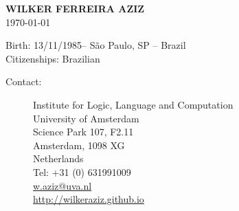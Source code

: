 \documentclass[10pt,a4paper,oneside]{article}
\makeatletter
\newcommand{\myname}{WILKER FERREIRA AZIZ\xspace}
\newcommand{\birthday}{13/11/1985\xspace}
\newcommand{\location}{S\~ao Paulo, SP -- Brazil\xspace}
\newcommand{\citizenships}{Brazilian\xspace}
\newcommand{\contact}{Institute for Logic, Language and Computation \\
University of Amsterdam \\
Science Park 107, F2.11 \\
Amsterdam, 1098 XG \\
Netherlands  \\
Tel: +31 (0) 631991009 \\
\url{w.aziz@uva.nl} \\
\url{http://wilkeraziz.github.io} 
}
\makeatother
\begin{document}




\begin{center}
{\large \bf
\myname \\
}
{\small
\today \\
}
\end{center}

Birth: \birthday -- \location \\
Citizenships: \citizenships \\
\vspace{2mm}
\begin{description}
	\item[Contact:] \contact
\end{description}










\end{document}
